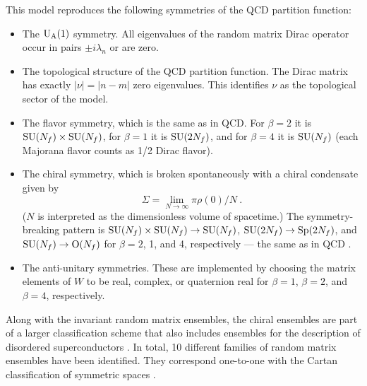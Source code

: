 This model reproduces the following symmetries of the QCD partition
function:
\begin{itemize}
\item The $\rm U_A(1)$ symmetry. All eigenvalues of the random matrix
  Dirac operator occur in pairs $\pm i\lambda_n$ or are zero.
\item The topological structure of the QCD partition function. The
  Dirac matrix has exactly $|\nu|=|n-m|$ zero eigenvalues. This
  identifies $\nu$ as the topological sector of the model.
\item The flavor symmetry, which is the same as in QCD. For $\beta = 2$ it is
  ${\rm SU}(N_f) \times {\rm SU}(N_f)$, for $\beta = 1$ it is ${\rm
    SU}(2N_f)$, and for $\beta = 4$ it is ${\rm SU}(N_f)$ (each
  Majorana flavor counts as 1/2 Dirac flavor).
\item The chiral symmetry, which is broken spontaneously with a chiral
  condensate given by
  \begin{equation}                                                 
    \Sigma = \lim_{N\rightarrow \infty} {\pi \rho(0)}/N\:.
  \end{equation}
  ($N$ is interpreted as the dimensionless volume of spacetime.) The
  symmetry-breaking pattern is {\cite{SmV}} ${\rm SU}(N_f) \times {\rm
    SU}(N_f)\to{\rm SU}(N_f)$, ${\rm SU}(2N_f)\to{\rm Sp}(2N_f)$, and
  ${\rm SU}(N_f)\to{\rm O}(N_f)$ for $\beta = 2$, 1, and 4,
  respectively --- the same as in QCD \cite{peskin}.
\item The anti-unitary symmetries.  These are implemented by choosing
  the matrix elements of $W$ to be real, complex, or quaternion real
  for $\beta =1$, $\beta =2$, and $ \beta =4$, respectively.
\end{itemize}
Along with the invariant random matrix ensembles, the chiral
ensembles are part of a larger classification scheme that also
includes ensembles for the description of disordered superconductors
\cite{Altland}. In total, 10 different families of random matrix
ensembles have been identified. They correspond one-to-one 
with the Cartan classification of symmetric spaces \cite{class}.

